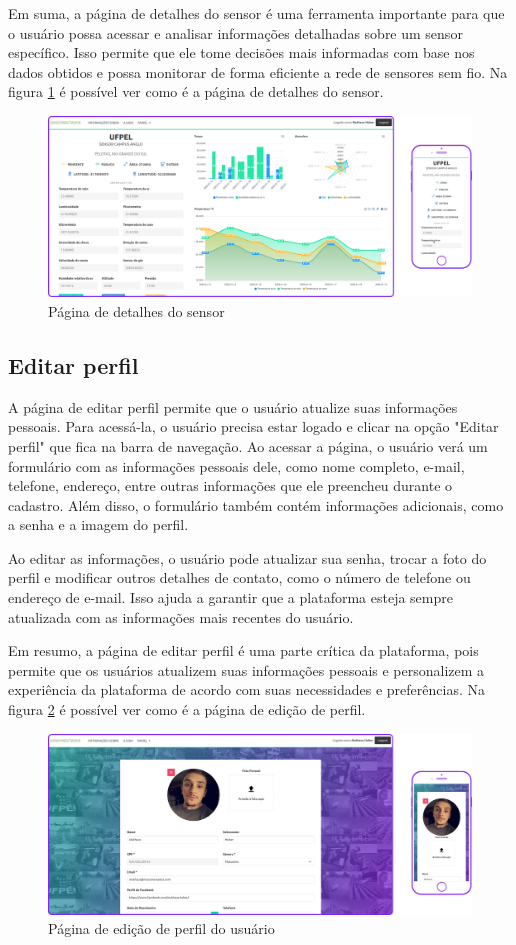 \documentclass[tcc,capa]{texufpel}
\begin{document}
Em suma, a página de detalhes do sensor é uma ferramenta importante para que o usuário possa acessar e analisar informações detalhadas sobre um sensor específico. Isso permite que ele tome decisões mais informadas com base nos dados obtidos e possa monitorar de forma eficiente a rede de sensores sem fio.  Na figura \ref{detalhes} é possível ver como é a página de detalhes do sensor.
\begin{figure}[htbp]
  \centering \includegraphics[scale=.2]{assets/detalhes.png}
  \caption{Página de detalhes do sensor}
  \label{detalhes}
\end{figure}
\newpage
\subsection{Editar perfil}
A página de editar perfil permite que o usuário atualize suas informações pessoais. Para acessá-la, o usuário precisa estar logado e clicar na opção "Editar perfil" que fica na barra de navegação.
Ao acessar a página, o usuário verá um formulário com as informações pessoais dele, como nome completo, e-mail, telefone, endereço, entre outras informações que ele preencheu durante o cadastro. Além disso, o formulário também contém informações adicionais, como a senha e a imagem do perfil.

Ao editar as informações, o usuário pode atualizar sua senha, trocar a foto do perfil e modificar outros detalhes de contato, como o número de telefone ou endereço de e-mail. Isso ajuda a garantir que a plataforma esteja sempre atualizada com as informações mais recentes do usuário.

Em resumo, a página de editar perfil é uma parte crítica da plataforma, pois permite que os usuários atualizem suas informações pessoais e personalizem a experiência da plataforma de acordo com suas necessidades e preferências. Na figura \ref{editperfil} é possível ver como é a página de edição de perfil.
\begin{figure}[htbp]
  \centering \includegraphics[scale=.2]{assets/editarperfil.png}
  \caption{Página de edição de perfil do usuário}
  \label{editperfil}
\end{figure}
\newpage
\end{document}
